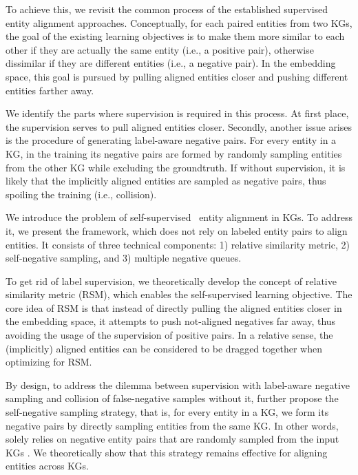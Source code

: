 To achieve this, we revisit the common process of the established supervised entity alignment approaches. 
Conceptually, for each paired entities from two KGs, the goal of the existing learning objectives is to make them more similar to each other if they are actually the same entity (i.e., a positive pair), otherwise dissimilar if they are different entities (i.e., a negative pair). 
In the embedding space, this goal is pursued by pulling aligned entities closer and pushing different entities farther away.


We identify the parts where supervision is required in this process. At first place, the supervision serves to pull aligned entities closer.
Secondly, another issue arises is the procedure of generating label-aware negative pairs. 
For every entity in a KG, in the training its negative pairs are formed by randomly sampling entities from the other KG while excluding the groundtruth. 
If without supervision, it is likely that the implicitly aligned entities are sampled as negative pairs, thus spoiling the training (i.e., collision).


We introduce the problem of self-supervised~\cite{liu2020self} entity alignment in KGs. 
To address it, we present the \solution framework, which does not rely on labeled entity pairs to align entities. 
It consists of three technical components: 1) relative similarity metric, 2) self-negative sampling, and 3) multiple negative queues. 

To get rid of label supervision, we theoretically develop the concept of relative similarity metric (RSM), which enables the self-supervised learning objective. 
The core idea of RSM is that instead of directly pulling the aligned entities closer in the embedding space, it attempts to push not-aligned negatives far away, thus avoiding the usage of the supervision of positive pairs. 
In a relative sense, the (implicitly) aligned entities can be considered to be dragged together when optimizing for RSM. 

By design, to address the dilemma between supervision with label-aware negative sampling and collision of false-negative samples without it, \solution further propose the self-negative sampling strategy, that is, for every entity in a KG, we form its negative pairs by directly sampling entities from the same KG. 
In other words, \solution solely relies on negative entity pairs that are randomly sampled from the input KGs . 
We theoretically show that this strategy remains effective for aligning entities across KGs. 


